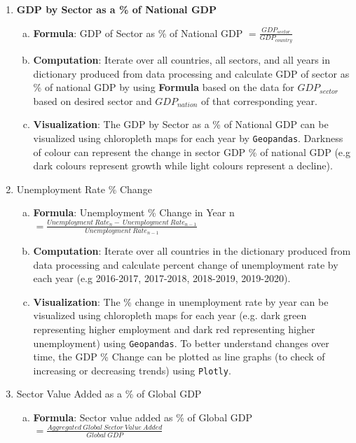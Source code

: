 \documentclass[fontsize=11pt]{article}
\begin{document}
\begin{enumerate}
        \item \textbf{GDP by Sector as a \% of National GDP}
            \begin{enumerate}[(a)]
                \item \textbf{Formula}: GDP of Sector as \% of National GDP $= \frac{GDP_{{sector}}}{GDP_{country}}$
                \item \textbf{Computation}: Iterate over all countries, all sectors, and all years in dictionary produced from data processing and calculate GDP of sector as \% of national GDP by using \textbf{Formula} based on the data for $GDP_{sector}$ based on desired sector and $GDP_{nation}$ of that corresponding year.
                \item \textbf{Visualization}: The GDP by Sector as a \% of National GDP can be visualized using chloropleth maps for each year by \texttt{Geopandas}. Darkness of colour can represent the change in sector GDP \% of national GDP (e.g dark colours represent growth while light colours represent a decline).
            \end{enumerate}
        \item Unemployment Rate \% Change
            \begin{enumerate}[(a)]
                \item \textbf{Formula}: Unemployment \% Change in Year n $= \frac{Unemployment \ Rate_{n}-\  Unemployment \ Rate_{n-1}}{Unemployment \ Rate_{n-1}}$
                \item \textbf{Computation}: Iterate over all countries in the dictionary produced from data processing and calculate percent change of unemployment rate by each year (e.g 2016-2017, 2017-2018, 2018-2019, 2019-2020).
                \item \textbf{Visualization}: The \% change in unemployment rate by year can be visualized using chloropleth maps for each year (e.g. dark green representing higher employment and dark red representing higher unemployment) using \texttt{Geopandas}. To better understand changes over time, the GDP \% Change can be plotted as line graphs (to check of increasing or decreasing trends) using \texttt{Plotly}.
            \end{enumerate}
        \item Sector Value Added as a \% of Global GDP
            \begin{enumerate}[(a)]
                \item \textbf{Formula}: Sector value added as \% of Global GDP $= \frac{Aggregated \ Global \ Sector \ Value \ Added}{Global \ GDP}$

\end{enumerate}
\end{enumerate}
\end{document}
